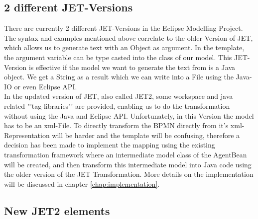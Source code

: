 \subsection{2 different JET-Versions}
There are currently 2 different JET-Versions in the Eclipse Modelling Project. The syntax and examples mentioned above correlate to the older Version of JET, which allows us to generate text with an Object as argument. In the template, the argument variable can be type casted into the class of our model. This JET-Version is effective if the model we want to generate the text from is a Java object. We get a String as a result which we can write into a File using the Java-IO or even Eclipse API.\\

In the updated version of JET, also called JET2, some workspace and java related "'tag-libraries"' are provided, enabling us to do the transformation without using the Java and Eclipse API. Unfortunately, in this Version the model has to be an xml-File.
To directly transform the BPMN directly from it's xml-Representation will be harder and the template will be confusing, therefore a decision has been made to implement the mapping using the existing transformation framework where an intermediate model class of the AgentBean will be created, and then transform this intermediate model into Java code using the older version of the JET Transformation.
More details on the implementation will be discussed in chapter \ref{chap:implementation}.

\subsection{New JET2 elements}